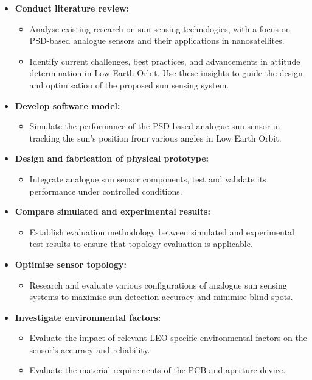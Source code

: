 \begin{itemize}
    \item \textbf{Conduct literature review:}
    \begin{itemize}
    \item Analyse existing research on sun sensing technologies, with a focus on PSD-based analogue sensors and their applications in nanosatellites.
    \item Identify current challenges, best practices, and advancements in attitude determination in Low Earth Orbit. Use these insights to guide the design and optimisation of the proposed sun sensing system.
    \end{itemize}
    \item \textbf{Develop software model:}
\begin{itemize}
    \item Simulate the performance of the PSD-based analogue sun sensor in tracking the sun's position from various angles in Low Earth Orbit.
\end{itemize}

\item \textbf{Design and fabrication of physical prototype:}
\begin{itemize}
    \item Integrate analogue sun sensor components, test and validate its performance under controlled conditions.
\end{itemize}

\item \textbf{Compare simulated and experimental results:}
\begin{itemize}
    \item Establish evaluation methodology between simulated and experimental test results to ensure that topology evaluation is applicable.
\end{itemize}

\item \textbf{Optimise sensor topology:}
\begin{itemize}
    \item Research and evaluate various configurations of analogue sun sensing systems to maximise sun detection accuracy and minimise blind spots.
\end{itemize}

\item \textbf{Investigate environmental factors:}
\begin{itemize}
    \item Evaluate the impact of relevant LEO specific environmental factors on the sensor's accuracy and reliability.
    \item Evaluate the material requirements of the PCB and aperture device.
\end{itemize}


\end{itemize}
